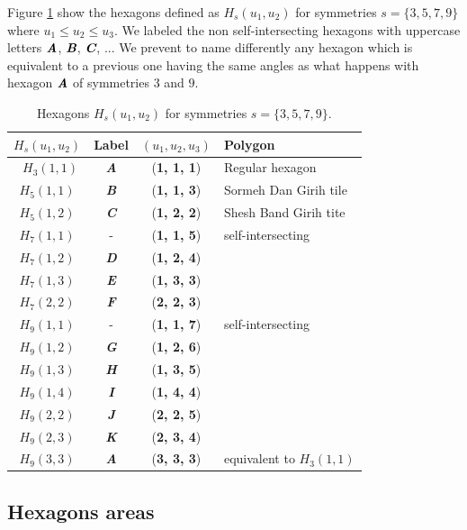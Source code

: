 \documentclass[11pt]{article}
\def\mathbi#1{\textbf{\em #1}}
\begin{document}
Figure \ref{tbl:hexagons-angles} show the hexagons defined as $H_s(u_1,u_2)$ for symmetries $s = \{3,5,7,9\}$ where $u_1 \leq u_2 \leq u_3$. We labeled the non self-intersecting hexagons with uppercase letters $\mathbi{A}$, $\mathbi{B}$, $\mathbi{C}$, ... We prevent to name differently any hexagon which is equivalent to a previous one having the same angles as what happens with hexagon $\mathbi{A}$ of symmetries $3$ and $9$.

\begin{table}[H]
\begin{center}
\begin{tabular}{| c | c | c | l | }
\hline
$H_s(u_1,u_2)$ & Label & $(u_1, u_2, u_3)$ & Polygon \\ \hline\
$H_3(1,1)$ & \mathbi{A} & (\textbf{1, 1, 1}) & Regular hexagon \\[0.5ex]
\hline
$H_5(1,1)$ & \mathbi{B} & (\textbf{1, 1, 3}) & Sormeh Dan Girih tile\\[0.5ex]
$H_5(1,2)$ & \mathbi{C} & (\textbf{1, 2, 2}) & Shesh Band Girih tite\\[0.5ex]
\hline
$H_7(1,1)$ & -          & (\textbf{1, 1, 5}) & self-intersecting \\[0.5ex]
$H_7(1,2)$ & \mathbi{D} & (\textbf{1, 2, 4}) & \\[0.5ex]
$H_7(1,3)$ & \mathbi{E} & (\textbf{1, 3, 3}) & \\[0.5ex]
$H_7(2,2)$ & \mathbi{F} & (\textbf{2, 2, 3}) & \\[0.5ex]
\hline
$H_9(1,1)$ & -          & (\textbf{1, 1, 7}) & self-intersecting \\[0.5ex]
$H_9(1,2)$ & \mathbi{G} & (\textbf{1, 2, 6}) & \\[0.5ex]
$H_9(1,3)$ & \mathbi{H} & (\textbf{1, 3, 5}) & \\[0.5ex]
$H_9(1,4)$ & \mathbi{I} & (\textbf{1, 4, 4}) & \\[0.5ex]
$H_9(2,2)$ & \mathbi{J} & (\textbf{2, 2, 5}) & \\[0.5ex]
$H_9(2,3)$ & \mathbi{K} & (\textbf{2, 3, 4}) & \\[0.5ex]
$H_9(3,3)$ & \mathbi{A} & (\textbf{3, 3, 3}) & equivalent to $H_3(1,1)$\\[1.1ex]
\hline
\end{tabular}
\caption{Hexagons $H_s(u_1,u_2)$ for symmetries $s = \{3,5,7,9\}$.} 
\label{tbl:hexagons-angles}
\end{center}
\end{table}


\subsection{Hexagons areas}
\end{document}
